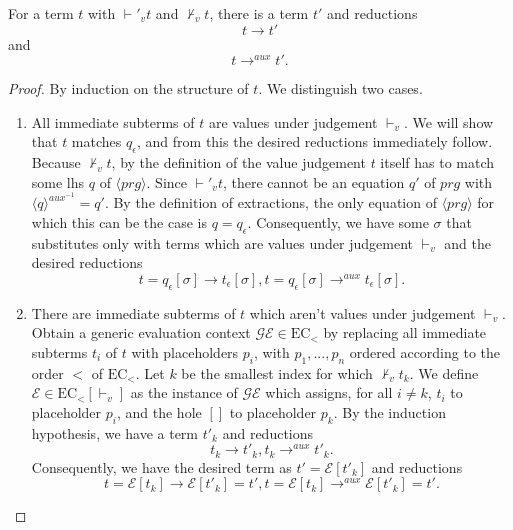 \begin{lemma}
\label{lem:app3}

For a term $t$ with $\vdash'_v t$ and $\not\vdash_v t$, there is a term $t'$ and reductions
\[
t \longrightarrow t'
\]
and
\[
t \longrightarrow^{aux} t'.
\]

\begin{proof}

By induction on the structure of $t$. We distinguish two cases.
\begin{enumerate}
\item All immediate subterms of $t$ are values under judgement $\vdash_v$. We will show that $t$ matches $q_\epsilon$, and from this the desired reductions immediately follow. Because $\not\vdash_v t$, by the definition of the value judgement $t$ itself has to match some lhs $q$ of $\langle prg \rangle$. Since $\vdash'_v t$, there cannot be an equation $q'$ of $prg$ with $\langle q \rangle^{aux^{-1}} = q'$. By the definition of extractions, the only equation of $\langle prg \rangle$ for which this can be the case is $q = q_\epsilon$. Consequently, we have some $\sigma$ that substitutes only with terms which are values under judgement $\vdash_v$ and the desired reductions
\[
t = q_\epsilon[\sigma] \longrightarrow t_\epsilon[\sigma], t = q_\epsilon[\sigma] \longrightarrow^{aux} t_\epsilon[\sigma].
\]

\item There are immediate subterms of $t$ which aren't values under judgement $\vdash_v$. Obtain a generic evaluation context $\mathcal{GE} \in \textrm{EC}_<$ by replacing all immediate subterms $t_i$ of $t$ with placeholders $p_i$, with $p_1, ..., p_n$ ordered according to the order $<$ of $\textrm{EC}_<$. Let $k$ be the smallest index for which $\not\vdash_v t_k$. We define $\mathcal{E} \in \textrm{EC}_<[\vdash_v]$ as the instance of $\mathcal{GE}$ which assigns, for all $i \neq k$, $t_i$ to placeholder $p_i$, and the hole $[]$ to placeholder $p_k$. By the induction hypothesis, we have a term $t'_k$ and reductions
\[
t_k \longrightarrow t'_k, t_k \longrightarrow^{aux} t'_k.
\]
Consequently, we have the desired term as $t' = \mathcal{E}[t'_k]$ and reductions
\[
t = \mathcal{E}[t_k] \longrightarrow \mathcal{E}[t'_k] = t', t = \mathcal{E}[t_k] \longrightarrow^{aux} \mathcal{E}[t'_k] = t'.
\]
\end{enumerate}

\end{proof}

\end{lemma}

